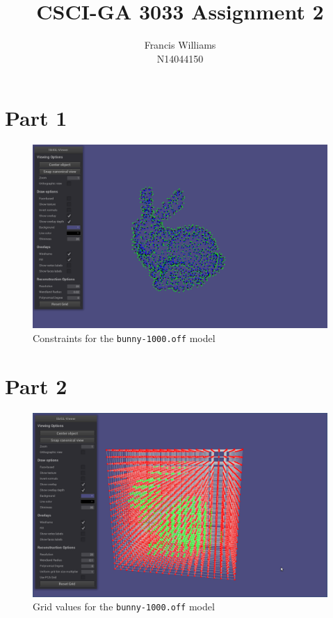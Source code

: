 \documentclass[11pt]{article}
\title{CSCI-GA 3033 Assignment 2}
\author{Francis Williams\\N14044150}
\begin{document}
\maketitle

\section*{Part 1}
\begin{figure}[ht]
\includegraphics[scale=0.3]{bunny_constraints.png}
\caption{Constraints for the \texttt{bunny-1000.off} model}
\end{figure}

\pagebreak

\section*{Part 2}
\begin{figure}[h]
\includegraphics[scale=0.3]{bunny_grid.png}
\caption{Grid values for the \texttt{bunny-1000.off} model}
\end{figure}
\end{document}
